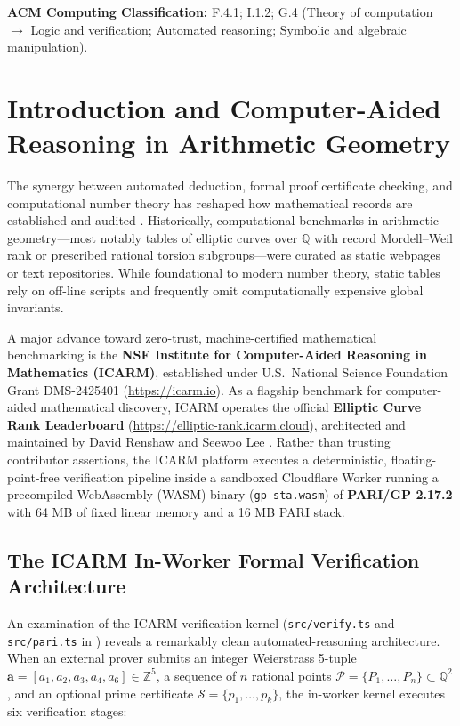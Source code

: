 \documentclass[10pt,a4paper]{article}
\theoremstyle{plain}
\theoremstyle{definition}
\theoremstyle{remark}
\begin{document}
\smallskip
\noindent\textbf{ACM Computing Classification:} F.4.1; I.1.2; G.4 (Theory of computation $\to$ Logic and verification; Automated reasoning; Symbolic and algebraic manipulation).

\bigskip

\section{Introduction and Computer-Aided Reasoning in Arithmetic Geometry}

The synergy between automated deduction, formal proof certificate checking, and computational number theory has reshaped how mathematical records are established and audited \cite{avigad2021formal,blanchette2016interactive,hales2017formal}. Historically, computational benchmarks in arithmetic geometry---most notably tables of elliptic curves over $\mathbb{Q}$ with record Mordell--Weil rank or prescribed rational torsion subgroups---were curated as static webpages or text repositories. While foundational to modern number theory, static tables rely on off-line scripts and frequently omit computationally expensive global invariants.

A major advance toward zero-trust, machine-certified mathematical benchmarking is the \textbf{NSF Institute for Computer-Aided Reasoning in Mathematics (ICARM)}, established under U.S.\ National Science Foundation Grant DMS-2425401 (\url{https://icarm.io}). As a flagship benchmark for computer-aided mathematical discovery, ICARM operates the official \textbf{Elliptic Curve Rank Leaderboard} (\url{https://elliptic-rank.icarm.cloud}), architected and maintained by David Renshaw and Seewoo Lee \cite{icarm2026leaderboard}. Rather than trusting contributor assertions, the ICARM platform executes a deterministic, floating-point-free verification pipeline inside a sandboxed Cloudflare Worker running a precompiled WebAssembly (WASM) binary (\texttt{gp-sta.wasm}) of \textbf{PARI/GP 2.17.2} \cite{parigp2024} with 64 MB of fixed linear memory and a 16 MB PARI stack.

\subsection{The ICARM In-Worker Formal Verification Architecture}

An examination of the ICARM verification kernel (\texttt{src/verify.ts} and \texttt{src/pari.ts} in \cite{icarm2026leaderboard}) reveals a remarkably clean automated-reasoning architecture. When an external prover submits an integer Weierstrass 5-tuple $\mathbf{a} = [a_1, a_2, a_3, a_4, a_6] \in \mathbb{Z}^5$, a sequence of $n$ rational points $\mathcal{P} = \{P_1, \dots, P_n\} \subset \mathbb{Q}^2$, and an optional prime certificate $\mathcal{S} = \{p_1, \dots, p_k\}$, the in-worker kernel executes six verification stages:
\end{document}
